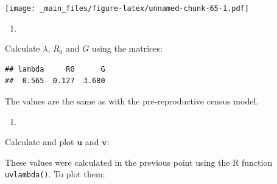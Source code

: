 \documentclass[
]{book}
\newenvironment{Shaded}{\begin{snugshade}}{\end{snugshade}}
\newcommand{\CommentTok}[1]{\textcolor[rgb]{0.56,0.35,0.01}{\textit{#1}}}
\newcommand{\DecValTok}[1]{\textcolor[rgb]{0.00,0.00,0.81}{#1}}
\newcommand{\FunctionTok}[1]{\textcolor[rgb]{0.00,0.00,0.00}{#1}}
\newcommand{\NormalTok}[1]{#1}
\newcommand{\OtherTok}[1]{\textcolor[rgb]{0.56,0.35,0.01}{#1}}
\newcommand{\SpecialCharTok}[1]{\textcolor[rgb]{0.00,0.00,0.00}{#1}}
\newcommand{\StringTok}[1]{\textcolor[rgb]{0.31,0.60,0.02}{#1}}
\providecommand{\tightlist}{%
  \setlength{\itemsep}{0pt}\setlength{\parskip}{0pt}}
\begin{document}
\texttt{[image: \_main\_files/figure-latex/unnamed-chunk-65-1.pdf]}

\begin{enumerate}
\def\labelenumi{\arabic{enumi}.}
\setcounter{enumi}{4}
\tightlist
\item
\end{enumerate}

Calculate \(\lambda\), \(R_0\) and \(G\) using the matrices:

\begin{Shaded}
\end{Shaded}

\begin{verbatim}
## lambda     R0      G 
##  0.565  0.127  3.680
\end{verbatim}

The values are the same as with the pre-reproductive census model.

\begin{enumerate}
\def\labelenumi{\arabic{enumi}.}
\setcounter{enumi}{5}
\tightlist
\item
\end{enumerate}

Calculate and plot \(\mathbf{u}\) and \(\mathbf{v}\):

These values were calculated in the previous point using the R function \texttt{uvlambda()}. To plot them:
\end{document}
